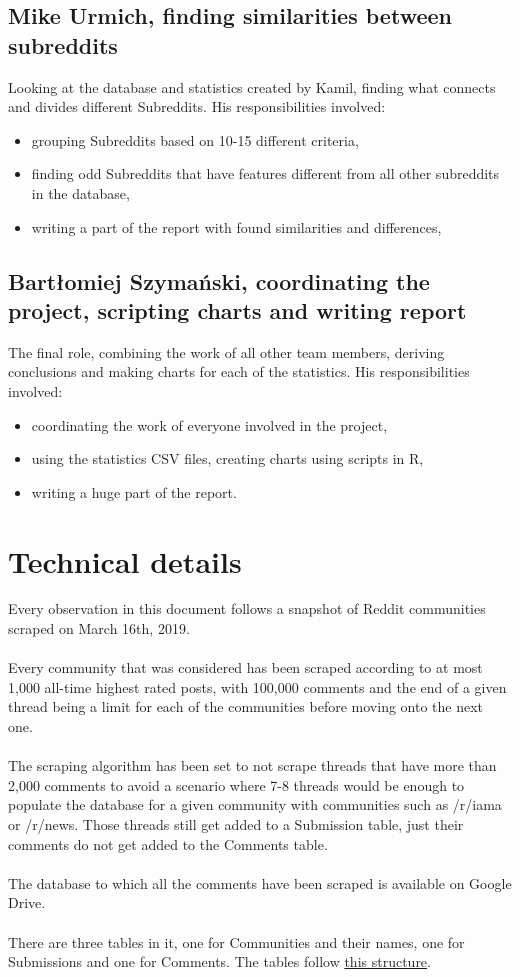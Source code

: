 \documentclass{article}
\begin{document}
\subsection{Mike Urmich, finding similarities between subreddits}
Looking at the database and statistics created by Kamil, finding what connects and divides different Subreddits. His responsibilities involved:
\begin{itemize}
	\item grouping Subreddits based on 10-15 different criteria,
	\item finding odd Subreddits that have features different from all other subreddits in the database,
	\item writing a part of the report with found similarities and differences,
\end{itemize}

\subsection{Bartłomiej Szymański, coordinating the project, scripting charts and writing report}
The final role, combining the work of all other team members, deriving conclusions and making charts for each of the statistics. His responsibilities involved:
\begin{itemize}
	\item coordinating the work of everyone involved in the project,
	\item using the statistics CSV files, creating charts using scripts in R,
	\item writing a huge part of the report.
\end{itemize}

\section{Technical details}
Every observation in this document follows a snapshot of Reddit communities scraped on March 16th, 2019. \\ \\
Every community that was considered has been scraped according to at most 1,000 all-time highest rated posts, with 100,000 comments and the end of a given thread being a limit for each of the communities before moving onto the next one. \\ \\
The scraping algorithm has been set to not scrape threads that have more than 2,000 comments to avoid a scenario where 7-8 threads would be enough to populate the database for a given community with communities such as /r/iama or /r/news. Those threads still get added to a Submission table, just their comments do not get added to the Comments table.\\ \\
The database to which all the comments have been scraped is available on Google Drive. \\ \\
There are three tables in it, one for Communities and their names, one for Submissions and one for Comments. The tables follow \href{https://github.com/scrapingredditboys/ScrapingRedditNaturalLanguageProcessingWUT2019/blob/master/reddit-collector/tables.sql}{this structure}.
\end{document}
